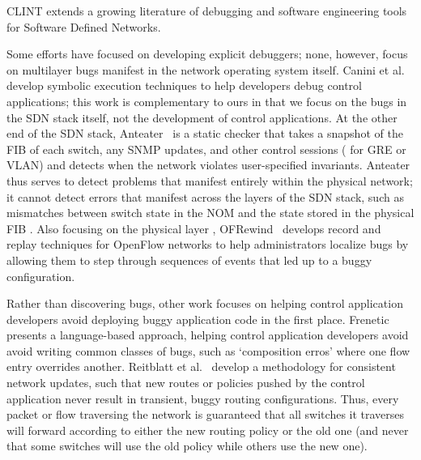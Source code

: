     CLINT extends a growing literature of debugging and software engineering tools for Software Defined Networks.
    
    Some efforts have focused on developing explicit debuggers; none, however, focus on multilayer bugs manifest in the network operating system itself. 
    Canini et al.~\cite{canini} develop symbolic execution techniques to help developers debug control applications; this work is complementary to ours  in that we focus on the bugs in the SDN stack itself, not the development of control applications. 
    At the other end of the SDN stack, Anteater~\cite{anteater} is a static checker that takes a snapshot of the FIB of each switch, any SNMP updates, and other control sessions (\eg{} for GRE or VLAN) and detects when the network violates user-specified invariants.
    Anteater thus serves to detect problems that manifest entirely within the physical network; it cannot detect errors that manifest across the layers of the SDN stack, such as mismatches between switch state in the NOM and the state stored in the physical FIB .
    Also focusing on the physical layer , OFRewind~\cite{ofrewind} develops record and replay techniques for OpenFlow networks to help administrators localize bugs by allowing them to step through sequences of events that led up to a buggy configuration.

    Rather than  discovering bugs, other work focuses on helping control application developers avoid deploying buggy application code in the first place. 
    Frenetic~\cite{frenetic} presents a language-based approach, helping control application developers avoid avoid writing common classes of bugs, such as `composition erros' where one flow entry overrides another.
    Reitblatt et al.~\cite{consistentupdates}  develop a methodology for consistent network updates, such that new routes or policies pushed by the control application never result in transient, buggy routing configurations.
    Thus, every packet or flow traversing the network is guaranteed that all switches it traverses will forward according to either the new routing policy or the old one (and never that some switches will use the old policy while others use the new one). 

